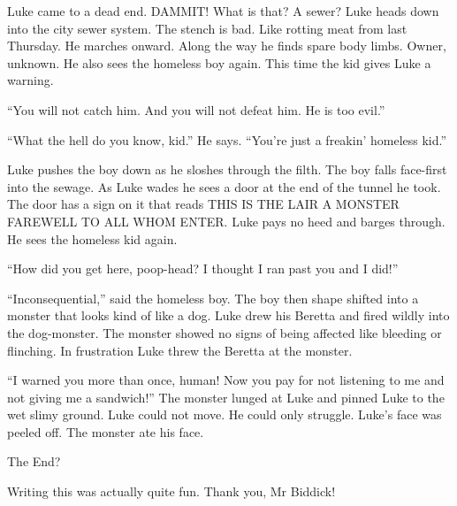 Luke came to a dead end. DAMMIT! What is that? A sewer? Luke heads
down into the city sewer system. The stench is bad. Like rotting
meat from last Thursday. He marches onward. Along the way he finds
spare body limbs. Owner, unknown. He also sees the homeless boy
again. This time the kid gives Luke a warning.



``You will not catch him. And you will not defeat him. He is
too evil.''



``What the hell do you know, kid.'' He says.
``You're just a freakin' homeless
kid.''

Luke pushes the boy down as he sloshes through the filth. The boy
falls face-first into the sewage. As Luke wades he sees a door at
the end of the tunnel he took. The door has a sign on it that reads
THIS IS THE LAIR A MONSTER FAREWELL TO ALL WHOM ENTER. Luke pays no
heed and barges through. He sees the homeless kid again.



``How did you get here, poop-head? I thought I ran past you
and I did!''



``Inconsequential,'' said the homeless boy. The boy then
shape shifted into a monster that looks kind of like a dog. Luke
drew his Beretta and fired wildly into the dog-monster. The monster
showed no signs of being affected like bleeding or flinching. In
frustration Luke threw the Beretta at the monster.



``I warned you more than once, human! Now you pay for not
listening to me and not giving me a sandwich!'' The monster
lunged at Luke and pinned Luke to the wet slimy ground. Luke could
not move. He could only struggle. Luke's face was peeled off.
The monster ate his face.



The End?



Writing this was actually quite fun. Thank you, Mr Biddick! 

 




